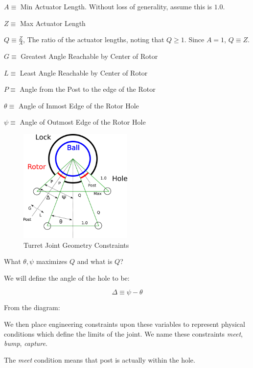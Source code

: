 \documentclass[11pt]{article}
\begin{document}
$ A \equiv $ Min Actuator Length. Without loss of generality, assume this is $ 1.0 $.

$ Z \equiv $ Max Actuator Length

$ Q \equiv \frac{Z}{A} $, The ratio of the actuator lengths, noting that $Q \geq 1$. Since $A = 1$, $Q \equiv Z$.

$ G \equiv $ Greatest Angle Reachable by Center of Rotor

$ L \equiv $ Least Angle Reachable by Center of Rotor

$ P \equiv $ Angle from the Post to the edge of the Rotor

$ \theta \equiv $ Angle of Inmost Edge of the Rotor Hole

$ \psi \equiv $ Angle of Outmost Edge of the Rotor Hole



\begin{figure}[H]
  \centering
    \includegraphics[width=0.5\textwidth]{figures/ConstraintDrawing.png}
    \caption[Constraints]{Turret Joint Geometry Constraints}
      \label{constraint-drawing}
\end{figure}

\bigskip

What $\theta, \psi$ maximizes $Q$ and what is $Q$?

\bigskip

We will define the angle of the hole to be:

\[\tag{Delta Definition} \Delta \equiv \psi - \theta \]

From the diagram:


We then place engineering constraints upon these variables to represent physical conditions
which define the limits of the joint.
We name these constraints \textit{meet}, \textit{bump}, \textit{capture}.

The \textit{meet} condition means that post is actually within the hole.
\end{document}
